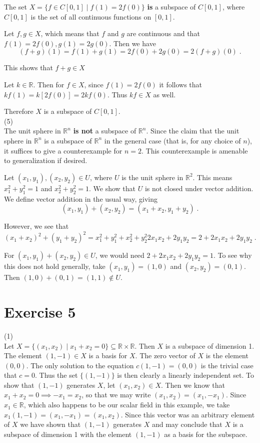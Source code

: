 \documentclass[11pt]{article}
\begin{document}
The set $X = \{f \in C[0,1] \; | \; f(1) = 2f(0)\}$ \textbf{is} a subspace of $C[0,1]$, where $C[0,1]$ is the set of all continuous functions on $[0,1]$. 

Let $f,g \in X$, which means that $f$ and $g$ are continuous and that $f(1) = 2f(0), g(1) = 2g(0)$. Then we have
$$(f+g)(1) = f(1) + g(1) = 2f(0) + 2g(0) = 2(f+g)(0) \;.$$

This shows that $f+g \in X$

Let $k \in \mathbb{R}$. Then for $f \in X$, since $f(1) = 2f(0)$ it follows that $kf(1) = k[2f(0)] = 2kf(0)$. Thus $kf \in X$ as well.

Therefore $X$ is a subspace of $C[0,1]$.\\

(5)\\

The unit sphere in $\mathbb{R}^n$ \textbf{is not} a subspace of $\mathbb{R}^n$. Since the claim that the unit sphere in $\mathbb{R}^n$ is a subspace of $\mathbb{R}^n$ in the general case (that is, for any choice of $n$), it suffices to give a counterexample for $n = 2$. This counterexample is amenable to generalization if desired. 

Let $(x_1,y_1), (x_2, y_2) \in U$, where $U$ is the unit sphere in $\mathbb{R}^2$. This means $x_1^2 + y_1^2 = 1$ and $x_2^2 + y_2^2 = 1$. We show that $U$ is not closed under vector addition. We define vector addition in the usual way, giving
$$(x_1,y_1) + (x_2,y_2) = (x_1+x_2, y_1 + y_2) \;.$$

However, we see that $$(x_1+x_2)^2 + (y_1 + y_2)^2 = x_1^2 + y_1^2 + x_2^2 + y_2^2 2x_1x_2 + 2y_1y_2 = 2 +  2x_1x_2 + 2y_1y_2\;.$$

For $(x_1,y_1) + (x_2,y_2) \in U$, we would need $2 +  2x_1x_2 + 2y_1y_2 = 1$. To see why this does not hold generally, take $(x_1,y_1) = (1,0)$ and $(x_2,y_2) = (0,1)$. Then $(1,0) + (0,1) = (1,1) \notin U$.\\

\section*{Exercise 5}

(1)\\

Let $X = \{(x_1,x_2) \; | \; x_1 + x_2 = 0\} \subseteq \mathbb{R} \times \mathbb{R}$. Then $X$ is a subspace of dimension 1. The element $(1,-1) \in X$ is a basis for $X$. The zero vector of $X$ is the element $(0,0)$. The only solution to the equation $c(1,-1) = (0,0)$ is the trivial case that $c = 0$. Thus the set $\{(1,-1)\}$ is then clearly a linearly independent set. To show that $(1,-1)$ generates $X$, let $(x_1, x_2) \in X$. Then we know that $x_1 + x_2 = 0 \implies -x_1 = x_2$, so that we may write $(x_1, x_2) = (x_1, -x_1)$. Since $x_1 \in \mathbb{R}$, which also happens to be our scalar field in this example, we take $x_1(1,-1) = (x_1,-x_1) = (x_1,x_2)$. Since this vector was an arbitrary element of $X$ we have shown that $(1,-1)$ generates $X$ and may conclude that $X$ is a subspace of dimension 1 with the element $(1,-1)$ as a basis for the subspace.\\
\end{document}
